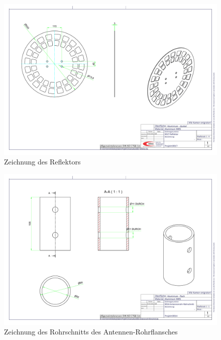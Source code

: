 \begin{figure}[h!]
	\includegraphics[angle=90,width=\textwidth]{../ref/0017-Reflektor.pdf}
	\caption{Zeichnung des Reflektors}
	\label{fig:Reflektor-Zeichnung}
\end{figure}

\begin{figure}[h!]
	\includegraphics[angle=90,width=\textwidth]{../ref/0014-Antennenrohr-Rohrschnitt.pdf}
	\caption{Zeichnung des Rohrschnitts des Antennen-Rohrflansches}
	\label{fig:Rohrschnitt-Rohrflansch-Antenne}
\end{figure}

